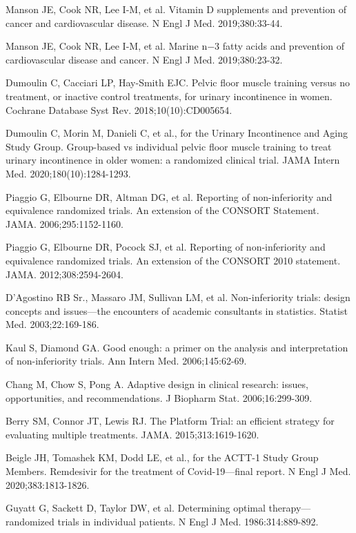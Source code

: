\begin{references}
\item Manson JE, Cook NR, Lee I-M, et al. Vitamin D supplements and prevention of cancer and cardiovascular disease. N Engl J Med. 2019;380:33-44.
\item Manson JE, Cook NR, Lee I-M, et al. Marine n−3 fatty acids and prevention of cardiovascular disease and cancer. N Engl J Med. 2019;380:23-32.
\item Dumoulin C, Cacciari LP, Hay-Smith EJC. Pelvic floor muscle training versus no treatment, or inactive control treatments, for urinary incontinence in women. Cochrane Database Syst Rev. 2018;10(10):CD005654.
\item Dumoulin C, Morin M, Danieli C, et al., for the Urinary Incontinence and Aging Study Group. Group-based vs individual pelvic floor muscle training to treat urinary incontinence in older women: a randomized clinical trial. JAMA Intern Med. 2020;180(10):1284-1293.
\item Piaggio G, Elbourne DR, Altman DG, et al. Reporting of non-inferiority and equivalence randomized trials. An extension of the CONSORT Statement. JAMA. 2006;295:1152-1160.
\item Piaggio G, Elbourne DR, Pocock SJ, et al. Reporting of non-inferiority and equivalence randomized trials. An extension of the CONSORT 2010 statement. JAMA. 2012;308:2594-2604.
\item D’Agostino RB Sr., Massaro JM, Sullivan LM, et al. Non-inferiority trials: design concepts and issues—the encounters of academic consultants in statistics. Statist Med. 2003;22:169-186.
\item Kaul S, Diamond GA. Good enough: a primer on the analysis and interpretation of non-inferiority trials. Ann Intern Med. 2006;145:62-69.
\item Chang M, Chow S, Pong A. Adaptive design in clinical research: issues, opportunities, and recommendations. J Biopharm Stat. 2006;16:299-309.
\item Berry SM, Connor JT, Lewis RJ. The Platform Trial: an efficient strategy for evaluating multiple treatments. JAMA. 2015;313:1619-1620.
\item Beigle JH, Tomashek KM, Dodd LE, et al., for the ACTT-1 Study Group Members. Remdesivir for the treatment of Covid-19—final report. N Engl J Med. 2020;383:1813-1826.
\item Guyatt G, Sackett D, Taylor DW, et al. Determining optimal therapy— randomized trials in individual patients. N Engl J Med. 1986:314:889-892.

\end{references}
